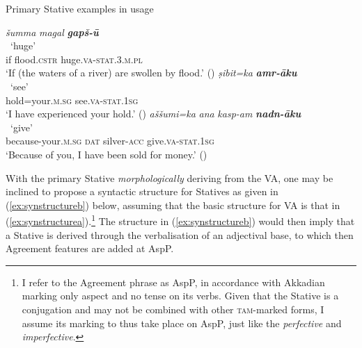 \documentclass[output=paper,colorlinks,citecolor=brown]{langscibook}
\begin{document}
\begin{exe}  \ex Primary Stative examples in usage \label{ex:primarystative_in_context}
   \begin{xlist} \ex \label{ex:primcontexta} 
   \glll \textit{šumma} \textit{magal} \textit{\textbf{gapš-ū}} \\
        {} {} ~`huge'\\
     if flood.\textsc{cstr} huge.\textsc{va-stat.3.m.pl}\\
    \glt `If (the waters of a river) are swollen by flood.' ()
\ex \label{ex:primcontextb} 
    \glll \textit{ṣibit=ka} \textit{\textbf{amr-āku}} \\
    {} ~`{see}'\\
     hold=your.\textsc{m.sg} see.\textsc{va-stat.1sg}\\
    \glt `I have experienced your hold.' ()
 \ex \label{ex:primcontextc} 
    \glll \textit{aššumi=ka} \textit{ana} \textit{kasp-am} \textit{\textbf{nadn-āku}} \\
    {} {} {} ~`give'\\
     because-your.\textsc{m.sg} \textsc{dat} silver-\textsc{acc} give.\textsc{va-stat.1sg}\\
    \glt `Because of you, I have been sold for money.' ()\\
    \end{xlist}
\end{exe}

 With the primary Stative  \emph{morphologically} deriving from the VA, one may be inclined to propose a syntactic structure for Statives as given in (\ref{ex:synstructureb}) below, assuming that the basic structure for VA is that in (\ref{ex:synstructurea}).\footnote{I refer to the Agreement phrase as AspP, in accordance with Akkadian marking only aspect and no tense on its verbs. Given that the Stative is a conjugation and may not be combined with other \textsc{tam}-marked forms, I assume its marking to thus take place on AspP, just like the \textit{perfective} and \textit{imperfective}.} The structure in (\ref{ex:synstructureb}) would then imply that a Stative is derived through the verbalisation  of an adjectival base, to which then Agreement features are added at AspP.
\end{document}

